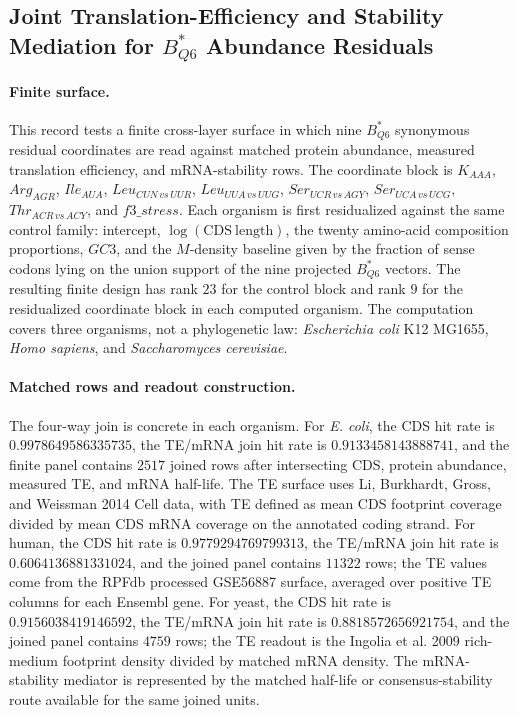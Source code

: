 
\subsection{Joint Translation-Efficiency and Stability Mediation for $B^*_{Q6}$ Abundance Residuals}
\label{sec:bioreality-q6-joint-te-stability-mediation}

\paragraph{Finite surface.}
This record tests a finite cross-layer surface in which nine $B^*_{Q6}$ synonymous residual coordinates are read against matched protein abundance, measured translation efficiency, and mRNA-stability rows. The coordinate block is
$K_{AAA}$, $Arg_{AGR}$, $Ile_{AUA}$, $Leu_{CUN\,vs\,UUR}$, $Leu_{UUA\,vs\,UUG}$, $Ser_{UCR\,vs\,AGY}$, $Ser_{UCA\,vs\,UCG}$, $Thr_{ACR\,vs\,ACY}$, and $f3\_stress$. Each organism is first residualized against the same control family: intercept, $\log(\mathrm{CDS\ length})$, the twenty amino-acid composition proportions, $GC3$, and the $M$-density baseline given by the fraction of sense codons lying on the union support of the nine projected $B^*_{Q6}$ vectors. The resulting finite design has rank $23$ for the control block and rank $9$ for the residualized coordinate block in each computed organism. The computation covers three organisms, not a phylogenetic law: \emph{Escherichia coli} K12 MG1655, \emph{Homo sapiens}, and \emph{Saccharomyces cerevisiae}.

\paragraph{Matched rows and readout construction.}
The four-way join is concrete in each organism. For \emph{E. coli}, the CDS hit rate is $0.9978649586335735$, the TE/mRNA join hit rate is $0.9133458143888741$, and the finite panel contains $2517$ joined rows after intersecting CDS, protein abundance, measured TE, and mRNA half-life. The TE surface uses Li, Burkhardt, Gross, and Weissman 2014 Cell data, with TE defined as mean CDS footprint coverage divided by mean CDS mRNA coverage on the annotated coding strand. For human, the CDS hit rate is $0.9779294769799313$, the TE/mRNA join hit rate is $0.6064136881331024$, and the joined panel contains $11322$ rows; the TE values come from the RPFdb processed GSE56887 surface, averaged over positive TE columns for each Ensembl gene. For yeast, the CDS hit rate is $0.9156038419146592$, the TE/mRNA join hit rate is $0.8818572656921754$, and the joined panel contains $4759$ rows; the TE readout is the Ingolia et al. 2009 rich-medium footprint density divided by matched mRNA density. The mRNA-stability mediator is represented by the matched half-life or consensus-stability route available for the same joined units.

